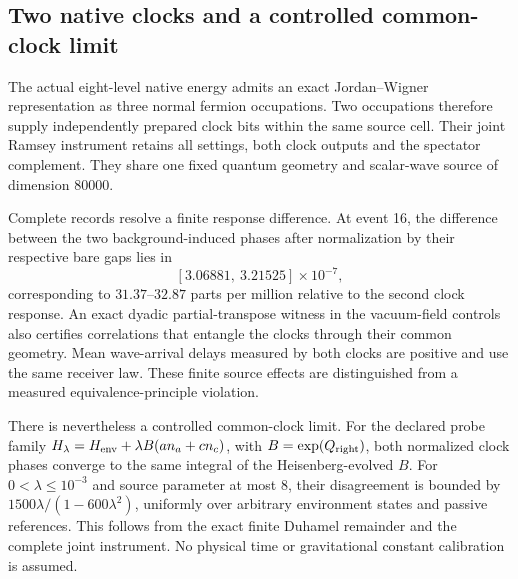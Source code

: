 \subsection{Two native clocks and a controlled common-clock limit}
The actual eight-level native energy admits an exact Jordan--Wigner representation as three normal fermion occupations. Two occupations therefore supply independently prepared clock bits within the same source cell. Their joint Ramsey instrument retains all settings, both clock outputs and the spectator complement. They share one fixed quantum geometry and scalar-wave source of dimension $80000$.

Complete records resolve a finite response difference. At event 16, the difference between the two background-induced phases after normalization by their respective bare gaps lies in
\[
[3.06881,\ 3.21525]\times10^{-7},
\]
corresponding to $31.37$--$32.87$ parts per million relative to the second clock response. An exact dyadic partial-transpose witness in the vacuum-field controls also certifies correlations that entangle the clocks through their common geometry. Mean wave-arrival delays measured by both clocks are positive and use the same receiver law. These finite source effects are distinguished from a measured equivalence-principle violation.

There is nevertheless a controlled common-clock limit. For the declared probe family $H_\lambda=H_{\rm env}+\lambda B(a n_a+c n_c)$, with $B=\exp(Q_{\rm right})$, both normalized clock phases converge to the same integral of the Heisenberg-evolved $B$. For $0<\lambda\leq10^{-3}$ and source parameter at most $8$, their disagreement is bounded by $1500\lambda/(1-600\lambda^2)$, uniformly over arbitrary environment states and passive references. This follows from the exact finite Duhamel remainder and the complete joint instrument. No physical time or gravitational constant calibration is assumed.
